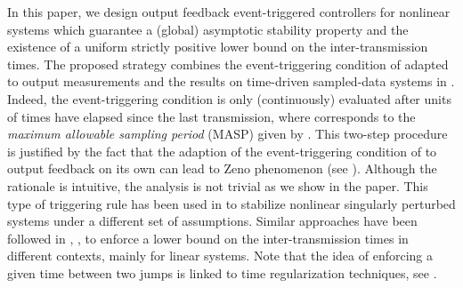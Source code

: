 \documentclass[a4paper, 9pt, twocolumn]{IEEEtran}
\theoremstyle{plain}
\theoremstyle{definition}
\begin{document}
In this paper, we design output feedback event-triggered controllers for nonlinear systems which guarantee a (global) asymptotic stability property and the existence of a uniform strictly positive lower bound on the inter-transmission times. The proposed strategy combines the event-triggering condition of \cite{Tabuada2007event} adapted to output measurements and the results on time-driven sampled-data systems in \cite{Nesic2009explicit}. Indeed, the event-triggering condition is only (continuously) evaluated after  units of times have elapsed since the last transmission, where  corresponds to the \textit{maximum allowable sampling period} (MASP) given by \cite{Nesic2009explicit}. This two-step procedure is justified by the fact that the adaption of the event-triggering condition of \cite{Tabuada2007event} to output feedback on its own can lead to Zeno phenomenon (see \cite{Donkers2012output}). Although the rationale is intuitive, the analysis is not trivial as we show in the paper. This type of triggering rule has been used in \cite{Abdelrahim2013Event} to stabilize nonlinear singularly perturbed systems under a different set of assumptions. Similar approaches have been followed in \cite{Forni2014event}, \cite{Mazo2011decentralized}, \cite{Wang2012asynchronous} to enforce a lower bound on the inter-transmission times in different contexts, mainly for linear systems. Note that the idea of enforcing a given time between two jumps is linked to time regularization techniques, see \cite{Johansson1999simulation}.
\end{document}
